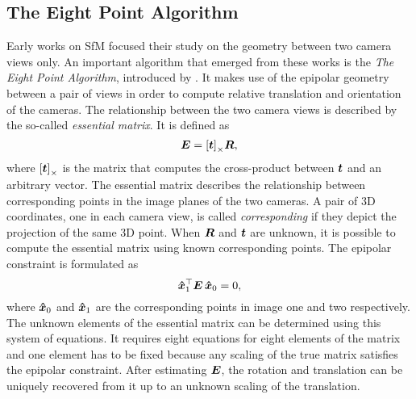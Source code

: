 		\subsection{The Eight Point Algorithm}
			Early works on SfM focused their study on the geometry between two camera views only.
			An important algorithm that emerged from these works is the \emph{The Eight Point Algorithm}, introduced by \cite{longuet1981}.
			It makes use of the epipolar geometry between a pair of views in order to compute relative translation and orientation of the cameras.
			The relationship between the two camera views is described by the so-called \emph{essential matrix}.
			It is defined as 
			\begin{equation}\label{eq:essential_matrix}
				\bm{E} = \left[ \bm{t} \right]_\times \! \bm{R},
			\end{equation}
			where $\left[ \bm{t} \right]_\times$ is the matrix that computes the cross-product between $\bm{t}$ and an arbitrary vector.
			The essential matrix describes the relationship between corresponding points in the image planes of the two cameras.
			A pair of 3D coordinates, one in each camera view, is called \emph{corresponding} if they depict the projection of the same 3D point.
			When $\bm{R}$ and $\bm{t}$ are unknown, it is possible to compute the essential matrix using known corresponding points.
			The epipolar constraint is formulated as 
			\begin{equation}\label{eq:epipolar_constraint}
				\bm{\hat{x}}_1^\top \bm{E} \, \bm{\hat{x}}_0 = 0,
			\end{equation}
			where $\bm{\hat{x}}_0$ and $\bm{\hat{x}}_1$ are the corresponding points in image one and two respectively.
			The unknown elements of the essential matrix can be determined using this system of equations.
			It requires eight equations for eight elements of the matrix and one element has to be fixed because any scaling of the true matrix satisfies the epipolar constraint.
			After estimating $\bm{E}$, the rotation and translation can be uniquely recovered from it up to an unknown scaling of the translation.
			
